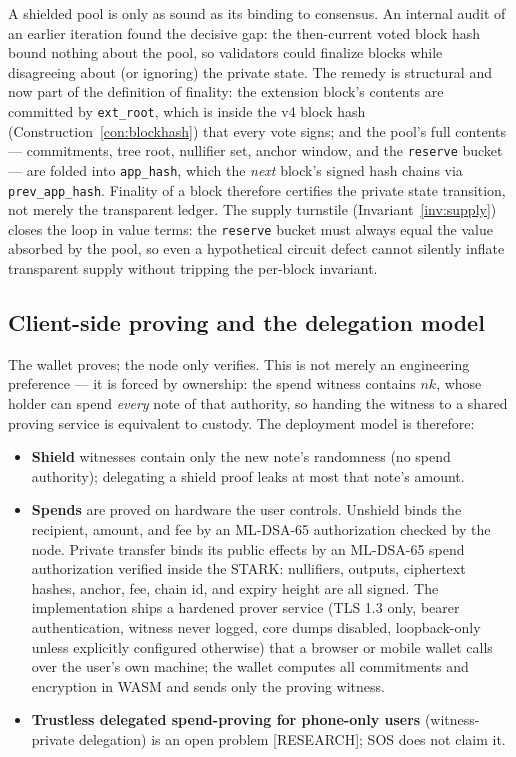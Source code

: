 \documentclass[11pt]{article}
\newcommand{\code}[1]{\texttt{#1}}
\newcommand{\mldsa}{ML\mbox{-}DSA\mbox{-}65}
\newcommand{\statusR}{\textcolor{statred}{\textsf{\scriptsize[RESEARCH]}}}
\theoremstyle{plain}
\theoremstyle{definition}
\theoremstyle{remark}
\begin{document}
A shielded pool is only as sound as its binding to consensus. An internal
audit of an earlier iteration found the decisive gap: the then-current voted
block hash bound nothing about the pool, so validators could finalize blocks
while disagreeing about (or ignoring) the private state. The remedy is
structural and now part of the definition of finality: the extension block's
contents are committed by \code{ext\_root}, which is inside the v4 block
hash (Construction~\ref{con:blockhash}) that every vote signs; and the
pool's full contents --- commitments, tree root, nullifier set, anchor
window, and the \code{reserve} bucket --- are folded into \code{app\_hash},
which the \emph{next} block's signed hash chains via
\code{prev\_app\_hash}. Finality of a block therefore certifies the private
state transition, not merely the transparent ledger. The supply turnstile
(Invariant~\ref{inv:supply}) closes the loop in value terms: the
\code{reserve} bucket must always equal the value absorbed by the pool, so
even a hypothetical circuit defect cannot silently inflate transparent
supply without tripping the per-block invariant.

\subsection{Client-side proving and the delegation model}
\label{sec:client-proving}

The wallet proves; the node only verifies. This is not merely an
engineering preference --- it is forced by ownership: the spend witness
contains $\mathit{nk}$, whose holder can spend \emph{every} note of that
authority, so handing the witness to a shared proving service is equivalent
to custody. The deployment model is therefore:

\begin{itemize}[leftmargin=1.6em]
\item \textbf{Shield} witnesses contain only the new note's randomness
  (no spend authority); delegating a shield proof leaks at most that note's
  amount.
\item \textbf{Spends} are proved on hardware the user controls. Unshield
  binds the recipient, amount, and fee by an \mldsa{} authorization checked by
  the node. Private transfer binds its public effects by an \mldsa{} spend
  authorization verified inside the STARK: nullifiers, outputs, ciphertext
  hashes, anchor, fee, chain id, and expiry height are all signed. The
  implementation ships a hardened prover service (TLS 1.3 only, bearer
  authentication, witness never logged, core dumps disabled, loopback-only
  unless explicitly configured otherwise) that a browser or mobile wallet
  calls over the user's own machine; the wallet computes all commitments and
  encryption in WASM and sends only the proving witness.
\item \textbf{Trustless delegated spend-proving for phone-only users}
  (witness-private delegation) is an open problem \statusR{}; SOS does not
  claim it.
\end{itemize}
\end{document}
